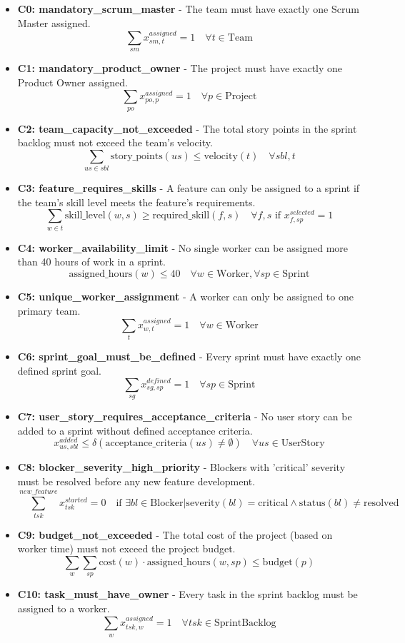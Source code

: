 \documentclass[11pt]{article}
\begin{document}
\begin{itemize}
    \item \textbf{C0: mandatory\_scrum\_master} - The team must have exactly one Scrum Master assigned.
        \[ \sum_{sm} x_{sm, t}^{assigned} = 1 \quad \forall t \in \text{Team} \]
    \item \textbf{C1: mandatory\_product\_owner} - The project must have exactly one Product Owner assigned.
        \[ \sum_{po} x_{po, p}^{assigned} = 1 \quad \forall p \in \text{Project} \]
    \item \textbf{C2: team\_capacity\_not\_exceeded} - The total story points in the sprint backlog must not exceed the team's velocity.
        \[ \sum_{us \in sbl} \text{story\_points}(us) \leq \text{velocity}(t) \quad \forall sbl, t \]
    \item \textbf{C3: feature\_requires\_skills} - A feature can only be assigned to a sprint if the team's skill level meets the feature's requirements.
        \[ \sum_{w \in t} \text{skill\_level}(w, s) \geq \text{required\_skill}(f, s) \quad \forall f, s \text{ if } x_{f, sp}^{selected} = 1 \]
    \item \textbf{C4: worker\_availability\_limit} - No single worker can be assigned more than 40 hours of work in a sprint.
        \[ \text{assigned\_hours}(w) \leq 40 \quad \forall w \in \text{Worker}, \forall sp \in \text{Sprint} \]
    \item \textbf{C5: unique\_worker\_assignment} - A worker can only be assigned to one primary team.
        \[ \sum_{t} x_{w, t}^{assigned} = 1 \quad \forall w \in \text{Worker} \]
    \item \textbf{C6: sprint\_goal\_must\_be\_defined} - Every sprint must have exactly one defined sprint goal.
        \[ \sum_{sg} x_{sg, sp}^{defined} = 1 \quad \forall sp \in \text{Sprint} \]
    \item \textbf{C7: user\_story\_requires\_acceptance\_criteria} - No user story can be added to a sprint without defined acceptance criteria.
        \[ x_{us, sbl}^{added} \leq \delta(\text{acceptance\_criteria}(us) \neq \emptyset) \quad \forall us \in \text{UserStory} \]
    \item \textbf{C8: blocker\_severity\_high\_priority} - Blockers with 'critical' severity must be resolved before any new feature development.
        \[ \sum_{tsk}^{new\_feature} x_{tsk}^{started} = 0 \quad \text{if } \exists bl \in \text{Blocker} | \text{severity}(bl)=\text{critical} \wedge \text{status}(bl)\neq\text{resolved} \]
    \item \textbf{C9: budget\_not\_exceeded} - The total cost of the project (based on worker time) must not exceed the project budget.
        \[ \sum_{w} \sum_{sp} \text{cost}(w) \cdot \text{assigned\_hours}(w, sp) \leq \text{budget}(p) \]
    \item \textbf{C10: task\_must\_have\_owner} - Every task in the sprint backlog must be assigned to a worker.
        \[ \sum_{w} x_{tsk, w}^{assigned} = 1 \quad \forall tsk \in \text{SprintBacklog} \]
\end{itemize}
\end{document}
